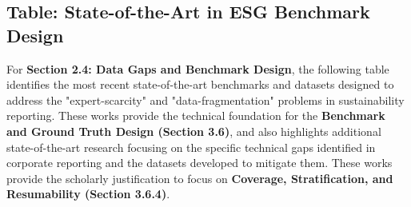 \subsection{Table: State-of-the-Art in ESG Benchmark Design}

For \textbf{Section 2.4: Data Gaps and Benchmark Design}, the following table identifies the most recent state-of-the-art benchmarks and datasets designed to address the "expert-scarcity" and "data-fragmentation" problems in sustainability reporting. These works provide the technical foundation for the \textbf{Benchmark and Ground Truth Design (Section 3.6)}, and also highlights additional state-of-the-art research focusing on the specific technical gaps identified in corporate reporting and the datasets developed to mitigate them. These works provide the scholarly justification to focus on \textbf{Coverage, Stratification, and Resumability (Section 3.6.4)}.


